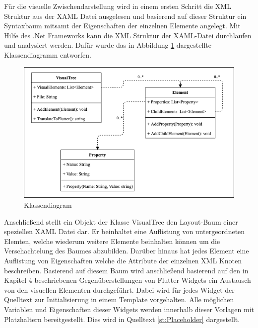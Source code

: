 Für die visuelle Zwischendarstellung wird in einem ersten Schritt die XML Struktur aus der XAML Datei ausgelesen und basierend auf dieser Struktur ein Syntaxbaum mitsamt der Eigenschaften der einzelnen Elemente angelegt.  Mit Hilfe des .Net Frameworks kann die XML Struktur der XAML-Datei durchlaufen und analysiert werden.  Dafür wurde das in Abbildung \ref{fig:Klassendiagram} dargestellte Klassendiagramm entworfen. 
\newpage

\begin{figure}[!ht]
 \includegraphics[width=\textwidth,keepaspectratio]{Images/Implementation/Klassendiagram.png}
 \caption{Klassendiagram}
 \label{fig:Klassendiagram}
\end{figure}

Anschließend stellt ein Objekt der Klasse VisualTree den Layout-Baum einer speziellen XAML Datei dar.  Er beinhaltet eine Auflistung von untergeordneten Elemten, welche wiederum weitere Elemente beinhalten können um die Verschachtelung des Baumes abzubilden. Darüber hinaus hat jedes Element eine Auflistung von Eigenschaften welche die Attribute der einzelnen XML Knoten beschreiben.  Basierend auf diesem Baum wird anschließend basierend auf den in Kapitel 4 beschriebenen Gegenüberstellungen von Flutter Widgets ein Austausch von den visuellen Elementen durchgeführt.  Dabei wird für jedes Widget der Quelltext zur Initialisierung in einem Template vorgehalten.  Alle möglichen Variablen und Eigenschaften dieser Widgets werden innerhalb dieser Vorlagen mit Platzhaltern bereitgestellt.  Dies wird in Quelltext \ref{st:Placeholder} dargestellt.

 

